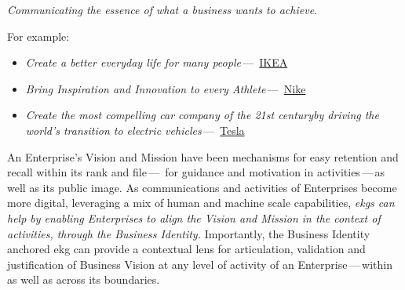 \textit{Communicating the essence of what a business wants to achieve}.

For example:

\begin{itemize}
    \item \textit{Create a better everyday life for many people}\,---\,%
    \href{https://www.ikea.com/gb/en/this-is-ikea/about-us/vision-and-business-idea-pub9cd02291}{IKEA}
    \item \textit{Bring Inspiration and Innovation to every Athlete}\,---\,%
    \href{https://www.nike.com/gb/help/a/nikeinc-mission}{Nike}
    \item \textit{Create the most compelling car company of the 21st century\newline by driving the world's
    transition to electric vehicles}\,---\,%
    \href{https://visionarybusinessperson.com/tesla-mission-statement/}{Tesla}
\end{itemize}

An Enterprise’s Vision and Mission have been mechanisms for easy
retention and recall within its rank and file\,---\,%
for guidance and motivation in activities\,---\,as well as its public image.
As communications and activities of Enterprises become more digital, leveraging a mix of human and machine scale
capabilities, \textit{\glspl{ekg} can help by enabling Enterprises to align the Vision and Mission in the context of activities,
through the Business Identity.}
Importantly, the Business Identity anchored \gls{ekg} can provide a contextual lens for articulation,
validation and justification of Business Vision at any level of activity of an Enterprise\,---\,within as well as
across its boundaries.

